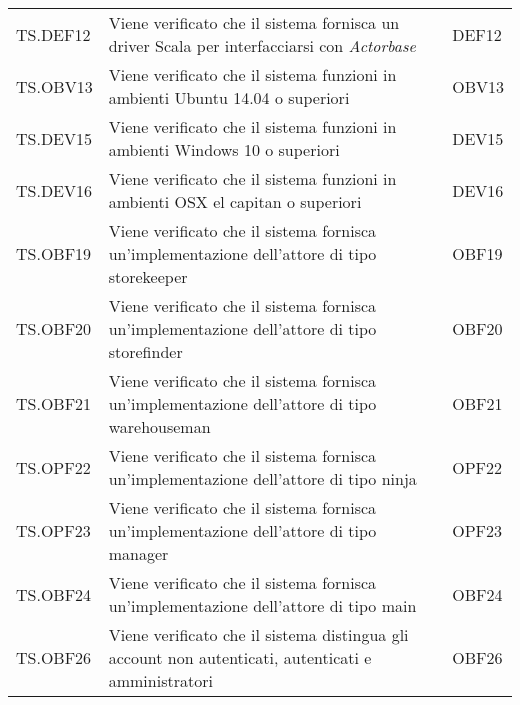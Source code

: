 \documentclass{scalatekids-article}
\begin{document}
\begin{center}
\begin{longtable}[H]{| l | p{10cm} | l | l |}
    TS.DEF12 & Viene verificato che il sistema fornisca un driver Scala per interfacciarsi con \textit{Actorbase} & & DEF12\\
    TS.OBV13 & Viene verificato che il sistema funzioni in ambienti Ubuntu 14.04 o superiori & & OBV13\\
    TS.DEV15 & Viene verificato che il sistema funzioni in ambienti Windows 10 o superiori & & DEV15\\
    TS.DEV16 & Viene verificato che il sistema funzioni in ambienti OSX el capitan o superiori & & DEV16\\
    \hline
    TS.OBF19 & Viene verificato che il sistema fornisca un'implementazione dell'attore di tipo storekeeper & & OBF19\\
    TS.OBF20 & Viene verificato che il sistema fornisca un'implementazione dell'attore di tipo storefinder & & OBF20\\
    TS.OBF21 & Viene verificato che il sistema fornisca un'implementazione dell'attore di tipo warehouseman & & OBF21\\
    TS.OPF22 & Viene verificato che il sistema fornisca un'implementazione dell'attore di tipo ninja & & OPF22\\
    TS.OPF23 & Viene verificato che il sistema fornisca un'implementazione dell'attore di tipo manager & & OPF23\\
    TS.OBF24 & Viene verificato che il sistema fornisca un'implementazione dell'attore di tipo main & & OBF24\\
    TS.OBF26 & Viene verificato che il sistema distingua gli account non autenticati, autenticati e amministratori & & OBF26\\
    \hline
  \end{longtable}
\end{center}
\end{document}
